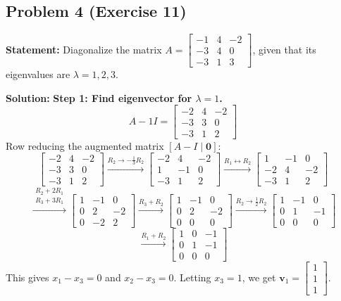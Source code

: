 \documentclass[11pt, a4paper]{article}
\theoremstyle{definition}
\theoremstyle{remark}
\begin{document}
\subsection{Problem 4 (Exercise 11)}
\textbf{Statement:} Diagonalize the matrix $A = \begin{bmatrix} -1 & 4 & -2 \\ -3 & 4 & 0 \\ -3 & 1 & 3 \end{bmatrix}$, given that its eigenvalues are $\lambda = 1, 2, 3$.

\textbf{Solution:}
\textbf{Step 1: Find eigenvector for $\lambda = 1$.}
\[
A - 1I = \begin{bmatrix} -2 & 4 & -2 \\ -3 & 3 & 0 \\ -3 & 1 & 2 \end{bmatrix}
\]
Row reducing the augmented matrix $[A - I \mid \mathbf{0}]$:
\[
\begin{bmatrix} -2 & 4 & -2 \\ -3 & 3 & 0 \\ -3 & 1 & 2 \end{bmatrix} \xrightarrow{R_2 \to -\frac{1}{3}R_2} \begin{bmatrix} -2 & 4 & -2 \\ 1 & -1 & 0 \\ -3 & 1 & 2 \end{bmatrix} \xrightarrow{R_1 \leftrightarrow R_2} \begin{bmatrix} 1 & -1 & 0 \\ -2 & 4 & -2 \\ -3 & 1 & 2 \end{bmatrix}
\]
\[
\xrightarrow{\substack{R_2 + 2R_1 \\ R_3 + 3R_1}} \begin{bmatrix} 1 & -1 & 0 \\ 0 & 2 & -2 \\ 0 & -2 & 2 \end{bmatrix} \xrightarrow{R_3 + R_2} \begin{bmatrix} 1 & -1 & 0 \\ 0 & 2 & -2 \\ 0 & 0 & 0 \end{bmatrix} \xrightarrow{R_2 \to \frac{1}{2}R_2} \begin{bmatrix} 1 & -1 & 0 \\ 0 & 1 & -1 \\ 0 & 0 & 0 \end{bmatrix}
\]
\[
\xrightarrow{R_1 + R_2} \begin{bmatrix} 1 & 0 & -1 \\ 0 & 1 & -1 \\ 0 & 0 & 0 \end{bmatrix}
\]
This gives $x_1 - x_3 = 0$ and $x_2 - x_3 = 0$. Letting $x_3 = 1$, we get $\mathbf{v}_1 = \begin{bmatrix} 1 \\ 1 \\ 1 \end{bmatrix}$.
\end{document}
